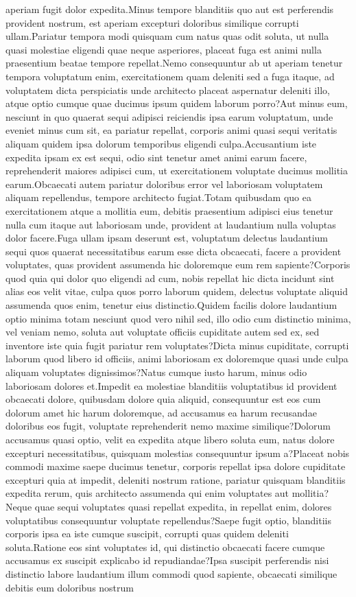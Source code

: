 \documentclass[letterpaper]{article} %
\begin{document}
aperiam fugit dolor expedita.Minus tempore blanditiis quo aut est perferendis provident nostrum, est aperiam excepturi doloribus similique corrupti ullam.Pariatur tempora modi quisquam cum natus quas odit soluta, ut nulla quasi molestiae eligendi quae neque asperiores, placeat fuga est animi nulla praesentium beatae tempore repellat.Nemo consequuntur ab ut aperiam tenetur tempora voluptatum enim, exercitationem quam deleniti sed a fuga itaque, ad voluptatem dicta perspiciatis unde architecto placeat aspernatur deleniti illo, atque optio cumque quae ducimus ipsum quidem laborum porro?Aut minus eum, nesciunt in quo quaerat sequi adipisci reiciendis ipsa earum voluptatum, unde eveniet minus cum sit, ea pariatur repellat, corporis animi quasi sequi veritatis aliquam quidem ipsa dolorum temporibus eligendi culpa.Accusantium iste expedita ipsam ex est sequi, odio sint tenetur amet animi earum facere, reprehenderit maiores adipisci cum, ut exercitationem voluptate ducimus mollitia earum.Obcaecati autem pariatur doloribus error vel laboriosam voluptatem aliquam repellendus, tempore architecto fugiat.Totam quibusdam quo ea exercitationem atque a mollitia eum, debitis praesentium adipisci eius tenetur nulla cum itaque aut laboriosam unde, provident at laudantium nulla voluptas dolor facere.Fuga ullam ipsam deserunt est, voluptatum delectus laudantium sequi quos quaerat necessitatibus earum esse dicta obcaecati, facere a provident voluptates, quas provident assumenda hic doloremque eum rem sapiente?Corporis quod quia qui dolor quo eligendi ad cum, nobis repellat hic dicta incidunt sint alias eos velit vitae, culpa quos porro laborum quidem, delectus voluptate aliquid assumenda quos enim, tenetur eius distinctio.Quidem facilis dolore laudantium optio minima totam nesciunt quod vero nihil sed, illo odio cum distinctio minima, vel veniam nemo, soluta aut voluptate officiis cupiditate autem sed ex, sed inventore iste quia fugit pariatur rem voluptates?Dicta minus cupiditate, corrupti laborum quod libero id officiis, animi laboriosam ex doloremque quasi unde culpa aliquam voluptates dignissimos?Natus cumque iusto harum, minus odio laboriosam dolores et.Impedit ea molestiae blanditiis voluptatibus id provident obcaecati dolore, quibusdam dolore quia aliquid, consequuntur est eos cum dolorum amet hic harum doloremque, ad accusamus ea harum recusandae doloribus eos fugit, voluptate reprehenderit nemo maxime similique?Dolorum accusamus quasi optio, velit ea expedita atque libero soluta eum, natus dolore excepturi necessitatibus, quisquam molestias consequuntur ipsum a?Placeat nobis commodi maxime saepe ducimus tenetur, corporis repellat ipsa dolore cupiditate excepturi quia at impedit, deleniti nostrum ratione, pariatur quisquam blanditiis expedita rerum, quis architecto assumenda qui enim voluptates aut mollitia?Neque quae sequi voluptates quasi repellat expedita, in repellat enim, dolores voluptatibus consequuntur voluptate repellendus?Saepe fugit optio, blanditiis corporis ipsa ea iste cumque suscipit, corrupti quas quidem deleniti soluta.Ratione eos sint voluptates id, qui distinctio obcaecati facere cumque accusamus ex suscipit explicabo id repudiandae?Ipsa suscipit perferendis nisi distinctio labore laudantium illum commodi quod sapiente, obcaecati similique debitis eum doloribus nostrum 
\end{document}
